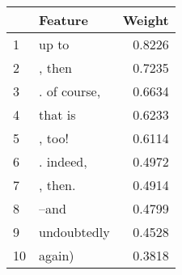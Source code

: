 \begin{tabular}{llr}
\toprule
{} &       Feature &  Weight \\
\midrule
1  &         up to &  0.8226 \\
2  &        , then &  0.7235 \\
3  &  . of course, &  0.6634 \\
4  &       that is &  0.6233 \\
5  &        , too! &  0.6114 \\
6  &     . indeed, &  0.4972 \\
7  &       , then. &  0.4914 \\
8  &         --and &  0.4799 \\
9  &   undoubtedly &  0.4528 \\
10 &        again) &  0.3818 \\
\bottomrule
\end{tabular}
